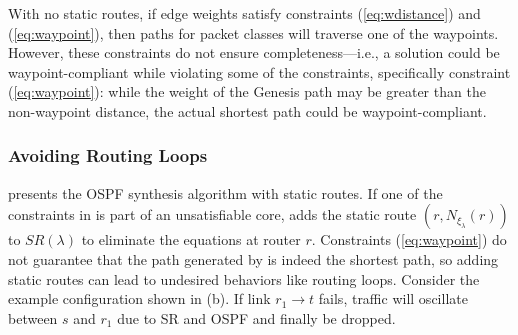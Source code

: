 With no static routes, if edge weights satisfy 
constraints (\ref{eq:wdistance}) and (\ref{eq:waypoint}), 
then paths for packet classes will traverse one of the waypoints. However, these
constraints do not ensure completeness---i.e., a solution could be waypoint-compliant
while violating some of the constraints, specifically constraint (\ref{eq:waypoint}):
while the weight of the Genesis path may be greater than the non-waypoint distance, 
the actual shortest path could be waypoint-compliant.


\subsubsection{Avoiding Routing Loops} \label{sec:loopavoidance} \hspace*{4mm}


 presents the OSPF 
synthesis algorithm with static routes.  
If one of the constraints in  is part of an unsatisfiable  
core, \name adds the static 
route
 $(r, N_{\xi_\lambda}(r))$ to
$SR(\lambda)$ to eliminate the equations at router $r$. 
Constraints (\ref{eq:waypoint}) do not 
guarantee that the path generated
by \genesis is indeed the shortest path, so adding
static routes can lead to undesired behaviors like routing loops.  
Consider the example configuration shown in (b).
If link $r_1 \rightarrow t$ fails, traffic will oscillate between 
$s$ and $r_1$ due to SR and OSPF and finally be dropped. 

